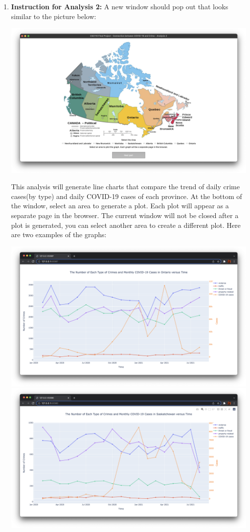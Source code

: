 \documentclass[fontsize=11pt]{article}
\begin{document}
\begin{enumerate}
  \item \textbf{Instruction for Analysis 2:} A new window should pop out that looks similar to the picture below: 
  
  \includegraphics[scale=0.3]{screenshot4.png} 
  
  This analysis will generate line charts that compare the trend of daily crime cases(by type) and daily COVID-19 cases of each province. At the bottom of the window, select an area to generate a plot. Each plot will appear as a separate page in the browser. The current window will not be closed after a plot is generated, you can select another area to create a different plot. Here are two examples of the graphs: 
  
  \includegraphics[scale=0.15]{screenshot5.png} \includegraphics[scale=0.15]{screenshot6.png}
  

\end{enumerate}
\end{document}
